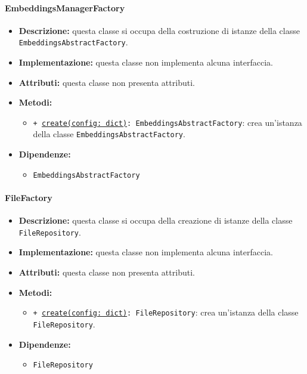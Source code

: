 \paragraph{EmbeddingsManagerFactory} \label{EmbeddingsManagerFactory}
\begin{itemize}
    \item \textbf{Descrizione:} questa classe si occupa della costruzione di istanze della classe \texttt{EmbeddingsAbstractFactory}.
    \item \textbf{Implementazione:} questa classe non implementa alcuna interfaccia.
    \item \textbf{Attributi:} questa classe non presenta attributi.
    \item \textbf{Metodi:}
    \begin{itemize}
        \item \texttt{+ \underline{create(config: dict)}: EmbeddingsAbstractFactory}: crea un'istanza della classe \texttt{EmbeddingsAbstractFactory}.
    \end{itemize}
    \item \textbf{Dipendenze:}
    \begin{itemize}
        \item \texttt{EmbeddingsAbstractFactory}
    \end{itemize}
\end{itemize} 

\paragraph{FileFactory} \label{FileFactory}
\begin{itemize}
    \item \textbf{Descrizione:} questa classe si occupa della creazione di istanze della classe \texttt{FileRepository}.
    \item \textbf{Implementazione:} questa classe non implementa alcuna interfaccia.
    \item \textbf{Attributi:} questa classe non presenta attributi.
    \item \textbf{Metodi:}
    \begin{itemize}
        \item \texttt{+ \underline{create(config: dict)}: FileRepository}: crea un'istanza della classe \texttt{FileRepository}.
    \end{itemize}
    \item \textbf{Dipendenze:}
    \begin{itemize}
        \item \texttt{FileRepository}
    \end{itemize}
\end{itemize} 

